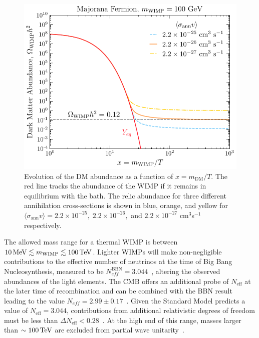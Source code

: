 \begin{figure}[t!]
    \centering
    \includegraphics{fig_dm_freezeout.pdf}
    \caption{Evolution of the DM abundance as a function of $x = m_\mathrm{DM}/T$. The red line tracks the abundance of the WIMP if it remains in equilibrium with the bath. The relic abundance for three different annihilation cross-sections is shown in blue, orange, and yellow for $\langle \sigma_\mathrm{ann} v\rangle = 2.2\times10^{-25},\;2.2\times10^{-26},$ and $2.2\times10^{-27}$ cm$^{3}$s$^{-1}$ respectively.}
    \label{fig:WIMP_freezeout}
\end{figure}

The allowed mass range for a thermal WIMP is between $10{\rm \,MeV}\lesssim m_\mathrm{WIMP} \lesssim 100{\rm \,TeV}$. Lighter WIMPs will make non-negligible contributions to the effective number of neutrinos at the time of Big Bang Nucleosynthesis, measured to be $N^\mathrm{BBN}_{eff} = 3.044$~\cite{Yeh:2022heq_oct_Probingphysicsstandard}, altering the observed abundances of the light elements. The CMB offers an additional probe of $N_\mathrm{eff}$ at the later time of recombination and can be combined with the BBN result leading to the value $N_{eff} = 2.99 \pm 0.17$~\cite{Planck:2018vyg_sep_Planck2018results}. Given the Standard Model predicts a value of $N_\mathrm{eff} = 3.044$, contributions from additional relativistic degrees of freedom must be less than $\Delta N_\mathrm{eff} < 0.28$~\cite{Yeh:2022heq_oct_Probingphysicsstandard}.  
At the high end of this range, masses larger than $\sim 100{\rm \,TeV}$ are excluded from partial wave unitarity~\cite{Griest:1989wd_UnitarityLimitsMass}. 
 

